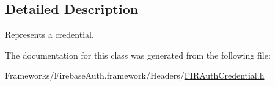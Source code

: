 \subsection{Detailed Description}
Represents a credential. 

The documentation for this class was generated from the following file\+:\begin{DoxyCompactItemize}
\item 
Frameworks/\+Firebase\+Auth.\+framework/\+Headers/\hyperlink{_f_i_r_auth_credential_8h}{F\+I\+R\+Auth\+Credential.\+h}\end{DoxyCompactItemize}
